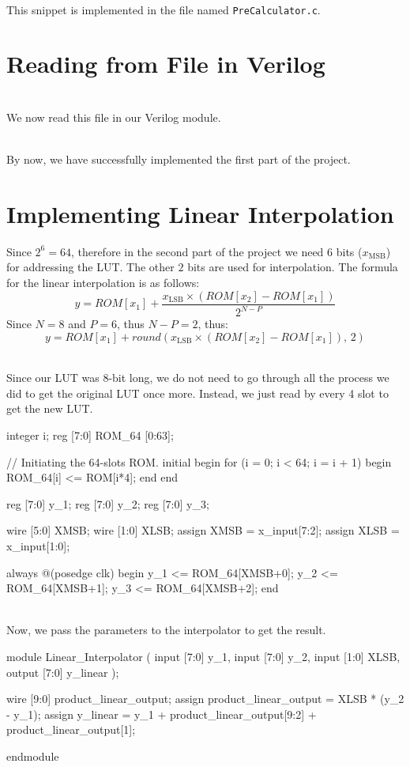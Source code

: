 \documentclass{article}
\let\oldsection\section
\renewcommand{\section}{%
    \setcounter{subsection}{0}%
    \oldsection%
}
\begin{document}
~\\This snippet is implemented in the file named \texttt{PreCalculator.c}.
\section{Reading from File in Verilog}
~\\We now read this file in our Verilog module.

~\\By now, we have successfully implemented the first part of the project.

\section{Implementing Linear Interpolation}
Since $2^6 = 64$, therefore in the second part of the project we need $ 6 $ bits ($x_{}$) for addressing the LUT. The other $ 2 $ bits are used for interpolation.
The formula for the linear interpolation is as follows:
\begin{equation}
    y = ROM[{x_1}] + \dfrac{x_{\text{LSB}} \times (ROM[{x_2}] - ROM[{x_1}])}{2^{N-P}}
\end{equation}
Since $N = 8$ and $P = 6$, thus $N-P=2$, thus:
\begin{equation}
    y =  ROM[{x_1}] + round(x_{\text{LSB}} \times (ROM[{x_2}] - ROM[{x_1}]), \, 2)
\end{equation}

~\\Since our LUT was 8-bit long, we do not need to go through all the process we did to get the original LUT once more. Instead, we just read by every 4 slot to get the new LUT.
\begin{vcode}
integer i;
reg [7:0] ROM_64 [0:63];
	

// Initiating the 64-slots ROM. 
initial begin
    for (i = 0; i < 64; i = i + 1) begin
        ROM_64[i] <= ROM[i*4];
    end
end
	
reg [7:0] y_1;
reg [7:0] y_2;
reg [7:0] y_3;

wire [5:0] XMSB;
wire [1:0] XLSB;
assign XMSB = x_input[7:2];
assign XLSB = x_input[1:0];
	
always @(posedge clk) begin
    y_1 <= ROM_64[XMSB+0];
    y_2 <= ROM_64[XMSB+1];
    y_3 <= ROM_64[XMSB+2];
end
\end{vcode}
~\\Now, we pass the parameters to the interpolator to get the result.
\begin{vcode}
module Linear_Interpolator (
    input [7:0] y_1,
    input [7:0] y_2,
    input [1:0] XLSB,
    output [7:0] y_linear
    );
	
    wire [9:0] product_linear_output;
    assign product_linear_output = XLSB * (y_2 - y_1);
    assign y_linear = y_1 + product_linear_output[9:2] + product_linear_output[1];

endmodule
\end{vcode}
\end{document}
